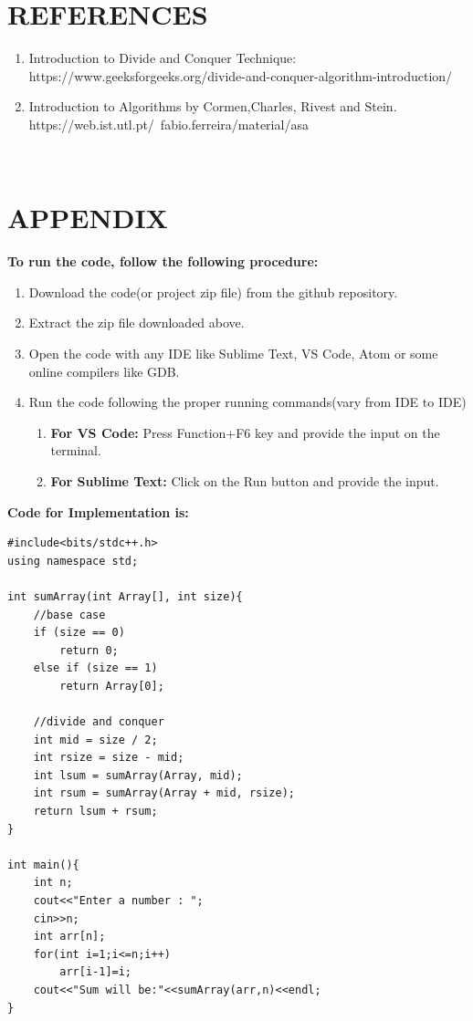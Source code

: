 \documentclass[10pt]{article}
\begin{document}
\begin{multicols*}{2}
\section*{REFERENCES}

\begin{enumerate}
\item Introduction to Divide and Conquer Technique:\\
https://www.geeksforgeeks.org/divide-and-conquer-algorithm-introduction/
\item Introduction to Algorithms by Cormen,Charles, Rivest and Stein.\\
https://web.ist.utl.pt/~fabio.ferreira/material/asa
\end{enumerate}\\

\section*{APPENDIX}
\textbf{To run the code, follow the following procedure:}
\begin{enumerate}
    \item Download the code(or project zip file) from the github repository.
    \item Extract the zip file downloaded above.
    \item Open the code with any IDE like Sublime Text, VS Code, Atom or some online compilers like GDB.
    \item Run the code following the proper running commands(vary from IDE to IDE)
    \begin{enumerate}
        \item \textbf{For VS Code:} Press Function+F6 key and provide the input on the terminal.
        \item \textbf{For Sublime Text:} Click on the Run button and provide the input.\\
    \end{enumerate}
\end{enumerate}
\textbf{Code for Implementation is:}

\begin{lstlisting}
#include<bits/stdc++.h>
using namespace std;

int sumArray(int Array[], int size){
    //base case
    if (size == 0)
        return 0;
    else if (size == 1)
        return Array[0];

    //divide and conquer
    int mid = size / 2;
    int rsize = size - mid;
    int lsum = sumArray(Array, mid);
    int rsum = sumArray(Array + mid, rsize);
    return lsum + rsum;
}

int main(){
    int n;
    cout<<"Enter a number : ";
    cin>>n;
    int arr[n];
    for(int i=1;i<=n;i++)
        arr[i-1]=i;
    cout<<"Sum will be:"<<sumArray(arr,n)<<endl;
}
\end{lstlisting}
\end{multicols*}
\clearpage

	
\end{document}
